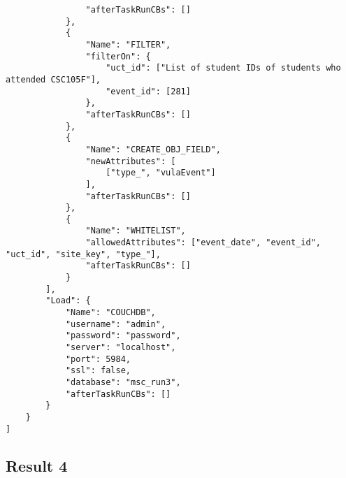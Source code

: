\begin{verbatim}
                "afterTaskRunCBs": []
            },
            {
                "Name": "FILTER",
                "filterOn": {
                    "uct_id": ["List of student IDs of students who attended CSC105F"],
                    "event_id": [281]
                },
                "afterTaskRunCBs": []
            },
            {
                "Name": "CREATE_OBJ_FIELD",
                "newAttributes": [
                    ["type_", "vulaEvent"]
                ],
                "afterTaskRunCBs": []
            },
            {
                "Name": "WHITELIST",
                "allowedAttributes": ["event_date", "event_id", "uct_id", "site_key", "type_"],
                "afterTaskRunCBs": []
            }
        ],
        "Load": {
            "Name": "COUCHDB",
            "username": "admin",
            "password": "password",
            "server": "localhost",
            "port": 5984,
            "ssl": false,
            "database": "msc_run3",
            "afterTaskRunCBs": []
        }
    }
]
\end{verbatim}

\subsection{Result 4}
\label{netl-run4-config}
\begin{verbatim}
\end{verbatim}